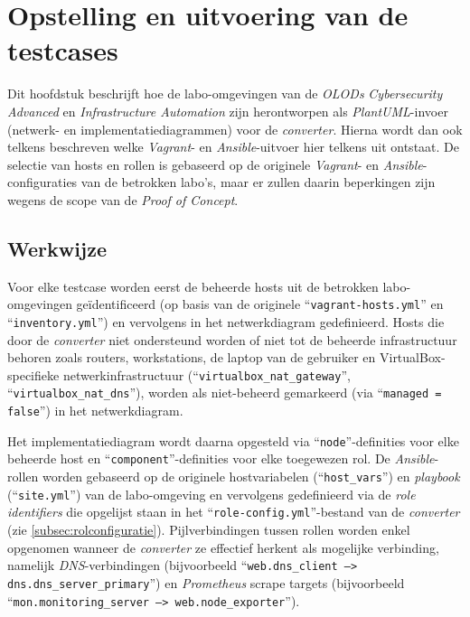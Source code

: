 
\chapter{Opstelling en uitvoering van de testcases}%
\label{ch:testcases}

Dit hoofdstuk beschrijft hoe de labo-omgevingen van de \emph{OLODs} \emph{Cybersecurity Advanced} en \emph{Infrastructure Automation} zijn herontworpen als \emph{PlantUML}-invoer (netwerk- en implementatiediagrammen) voor de \emph{converter}. Hierna wordt dan ook telkens beschreven welke \emph{Vagrant}- en \emph{Ansible}-uitvoer hier telkens uit ontstaat. De selectie van hosts en rollen is gebaseerd op de originele \emph{Vagrant}- en \emph{Ansible}-configuraties van de betrokken labo's, maar er zullen daarin beperkingen zijn wegens de scope van de \emph{Proof of Concept}.

\section{Werkwijze}%
\label{sec:werkwijze_testcases}

Voor elke testcase worden eerst de beheerde hosts uit de betrokken labo-omgevingen geïdentificeerd (op basis van de originele ``\texttt{vagrant-hosts.yml}'' en ``\texttt{inventory.yml}'') en vervolgens in het netwerkdiagram gedefinieerd.
Hosts die door de \emph{converter} niet ondersteund worden of niet tot de beheerde infrastructuur behoren zoals routers, workstations, de laptop van de gebruiker en VirtualBox-specifieke netwerkinfrastructuur (``\texttt{virtualbox\_nat\_gateway}'', ``\texttt{virtualbox\_nat\_dns}''), worden als niet-beheerd gemarkeerd (via ``\texttt{managed = false}'') in het netwerkdiagram.

Het implementatiediagram wordt daarna opgesteld via ``\texttt{node}''-definities voor elke beheerde host en ``\texttt{component}''-definities voor elke toegewezen rol.
De \emph{Ansible}-rollen worden gebaseerd op de originele hostvariabelen (``\texttt{host\_vars}'') en \emph{playbook} (``\texttt{site.yml}'') van de labo-omgeving en vervolgens gedefinieerd via de \emph{role identifiers} die opgelijst staan in het ``\texttt{role-config.yml}''-bestand van de \emph{converter} (zie \autoref{subsec:rolconfiguratie}).
Pijlverbindingen tussen rollen worden enkel opgenomen wanneer de \emph{converter} ze effectief herkent als mogelijke verbinding, namelijk \emph{DNS}-verbindingen (bijvoorbeeld ``\texttt{web.dns\_client --> dns.dns\_server\_primary}'') en \emph{Prometheus} scrape targets (bijvoorbeeld ``\texttt{mon.monitoring\_server --> web.node\_exporter}'').

